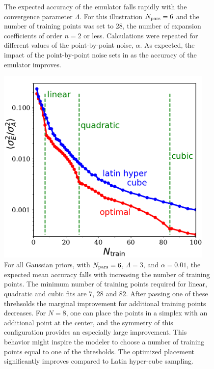 \documentclass[UserManual.tex]{subfiles}
\begin{document}
\begin{figure}
\begin{minipage}{0.475\textwidth}
\caption{\label{fig:Sigma2vsLambda}
The expected accuracy of the emulator falls rapidly with the convergence parameter $\Lambda$. For this illustration $N_{\rm pars}=6$ and the number of training points was set to 28, the number of expansion coefficients of order $n=2$ or less. Calculations were repeated for different values of the point-by-point noise, $\alpha$. As expected, the impact of the point-by-point noise sets in as the accuracy of the emulator improves.}
\end{minipage}
\end{figure}

\begin{figure}
\begin{minipage}{0.475\textwidth}
\includegraphics[width=0.95\textwidth]{figs/sigma2vsNTrain_log}
\caption{\label{fig:Sigma2vsNTrain}
For all Gaussian priors, with $N_{\rm pars}=6$, $\Lambda=3$, and $\alpha=0.01$, the expected mean accuracy falls with increasing the number of training points. The minimum number of training points required for linear, quadratic and cubic fits are 7, 28 and 82. After passing one of these threhsolds the marginal improvement for additional training points decreases. For $N=8$, one can place the points in a simplex with an additional point at the center, and the symmetry of this configuration provides an especially large improvement. This behavior might inspire the modeler to choose a number of training points equal to one of the thresholds. The optimized placement significantly improves compared to Latin hyper-cube sampling.
}
\end{minipage}
\end{figure}
\end{document}

